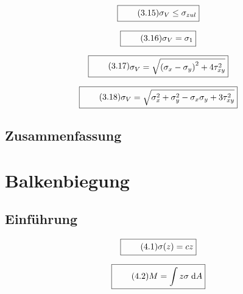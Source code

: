 \documentclass[11pt]{article}
\newcommand{\1}{ {\mathds{1}} }
\begin{document}
\begin{multicols}{2}
		\begin{equation}
			\boxed{
				\tag{3.15}
				\begin{split}
					\sigma_V \leq \sigma_{zul}
				\end{split}
			}
		\end{equation}

		\begin{equation}
			\boxed{
				\tag{3.16}
				\begin{split}
					\sigma_V= \sigma_1
				\end{split}
			}
		\end{equation}

		\begin{equation}
			\boxed{
				\tag{3.17}
				\begin{split}
					\sigma_V= \sqrt{ \left( \sigma_x - \sigma_y \right)^2 + 4\tau^2_{xy} }
				\end{split}
			}
		\end{equation}

		\begin{equation}
			\boxed{
				\tag{3.18}
				\begin{split}
					\sigma_V= \sqrt{\sigma_x^2 + \sigma_y^2 -\sigma_x\sigma_y + 3\tau^2_{xy} }
				\end{split}
			}
		\end{equation}

		\subsection{Zusammenfassung}

		\section{Balkenbiegung}
		\subsection{Einführung}

		\begin{equation}
			\boxed{
				\tag{4.1}
				\begin{split}
					\sigma(z) = c z
				\end{split}
			}
		\end{equation}

		\begin{equation}
			\boxed{
				\tag{4.2}
				\begin{split}
					M = \int{z\sigma \; \text{d}A}
				\end{split}
			}
		\end{equation}


\end{multicols}
\end{document}
